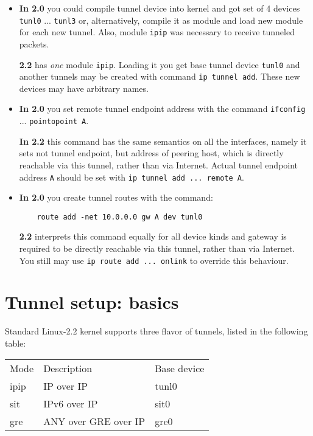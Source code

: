 \begin{itemize}

\item {\bf In 2.0} you could compile tunnel device into kernel
	and got set of 4 devices \verb|tunl0| ... \verb|tunl3| or,
	alternatively, compile it as module and load new module
	for each new tunnel. Also, module \verb|ipip| was necessary
	to receive tunneled packets.

      {\bf 2.2} has {\em one\/} module \verb|ipip|. Loading it you get base
	tunnel device \verb|tunl0| and another tunnels may be created with command
	\verb|ip tunnel add|. These new devices may have arbitrary names.


\item {\bf In 2.0} you set remote tunnel endpoint address with
	the command \verb|ifconfig| ... \verb|pointopoint A|.

	{\bf In 2.2} this command has the same semantics on all
	the interfaces, namely it sets not tunnel endpoint,
	but address of peering host, which is directly reachable
	via this tunnel,
	rather than via Internet. Actual tunnel endpoint address \verb|A|
	should be set with \verb|ip tunnel add ... remote A|.

\item {\bf In 2.0} you create tunnel routes with the command:
\begin{verbatim}
    route add -net 10.0.0.0 gw A dev tunl0
\end{verbatim}

	{\bf 2.2} interprets this command equally for all device
	kinds and gateway is required to be directly reachable via this tunnel,
	rather than via Internet. You still may use \verb|ip route add ... onlink|
	to override this behaviour.

\end{itemize}


\section{Tunnel setup: basics}

Standard Linux-2.2 kernel supports three flavor of tunnels,
listed in the following table:
\vspace{2mm}

\begin{tabular}{lll}
\vrule depth 0.8ex width 0pt\relax
Mode & Description  & Base device \\
ipip & IP over IP & tunl0 \\
sit & IPv6 over IP & sit0 \\
gre & ANY over GRE over IP & gre0
\end{tabular}

